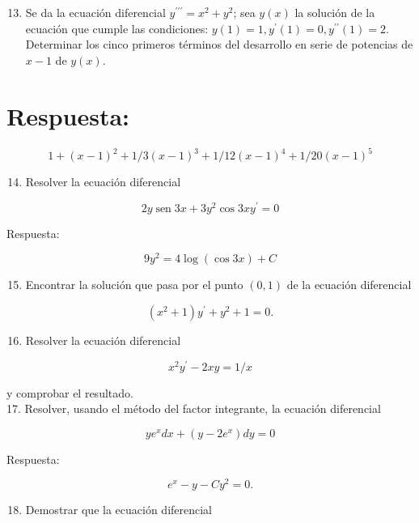 \documentclass[10pt]{article}
\theoremstyle{plain}
\theoremstyle{definition}
\theoremstyle{remark}
\begin{document}
\begin{enumerate}
  \setcounter{enumi}{12}
  \item Se da la ecuación diferencial $y^{\prime \prime \prime}=x^{2}+y^{2}$; sea $y(x)$ la solución de la ecuación que cumple las condiciones: $y(1)=1, y^{\prime}(1)=0, y^{\prime \prime}(1)=2$. Determinar los cinco primeros términos del desarrollo en serie de potencias de $x-1$ de $y(x)$.
\end{enumerate}

\section*{Respuesta:}
$$
1+(x-1)^{2}+1 / 3(x-1)^{3}+1 / 12(x-1)^{4}+1 / 20(x-1)^{5}
$$

\begin{enumerate}
  \setcounter{enumi}{13}
  \item Resolver la ecuación diferencial
\end{enumerate}

$$
2 y \operatorname{sen} 3 x+3 y^{2} \cos 3 x y^{\prime}=0
$$

Respuesta:

$$
9 y^{2}=4 \log (\cos 3 x)+C
$$

\begin{enumerate}
  \setcounter{enumi}{14}
  \item Encontrar la solución que pasa por el punto $(0,1)$ de la ecuación diferencial
\end{enumerate}

$$
\left(x^{2}+1\right) y^{\prime}+y^{2}+1=0 .
$$

\begin{enumerate}
  \setcounter{enumi}{15}
  \item Resolver la ecuación diferencial
\end{enumerate}

$$
x^{2} y^{\prime}-2 x y=1 / x
$$

y comprobar el resultado.\\
17. Resolver, usando el método del factor integrante, la ecuación diferencial

$$
y e^{x} d x+\left(y-2 e^{x}\right) d y=0
$$

Respuesta:

$$
e^{x}-y-C y^{2}=0 .
$$

\begin{enumerate}
  \setcounter{enumi}{17}
  \item Demostrar que la ecuación diferencial
\end{enumerate}
\end{document}
